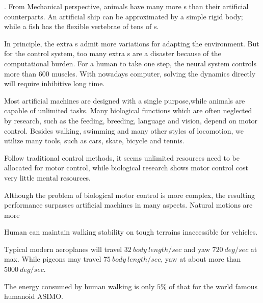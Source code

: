 \begin{itemize}
.
From Mechanical perspective, animals have many more {\dof}s than their artificial counterparts.
An artificial ship can be approximated by a simple rigid body; while a fish has the flexible vertebrae of tens of {\dof}s.


In principle, the extra {\dof}s admit more variations for adapting the environment. 
But for the control system, too many extra {\dof}s are a disaster because of the computational burden. 
For a human to take one step,  the neural system controls more than $600$ muscles.
With nowadays computer, solving the dynamics directly will require inhibitive long time.

 
Most artificial machines are designed with a single purpose,while animals are capable  of unlimited tasks.
Many biological functions which are often neglected by \cms research, such as the feeding, breeding, language and vision, depend on motor control. 
Besides walking, swimming and many other styles of locomotion, we utilize many tools, such as cars, skate, bicycle and tennis.

Follow traditional control methods, it seems unlimited resources need to be  allocated for motor control, while biological research shows motor control cost very little mental resources.

Although the problem of biological motor control is more complex, the resulting performance surpasses artificial machines in many aspects.
Natural motions are more
\begin{enumerate} 

Human can maintain walking stability on tough terrains inaccessible for vehicles.

Typical modern aeroplanes will travel $32\: body\: length/sec$ and yaw $720\: deg/sec$ at max.
While pigeons may travel $75 \:body\: length / sec$, yaw at about more than $5000 \: deg/sec$.

The energy consumed by human walking is only $5\%$ of that for the world famous humanoid ASIMO.
\end{enumerate}

\end{itemize}



